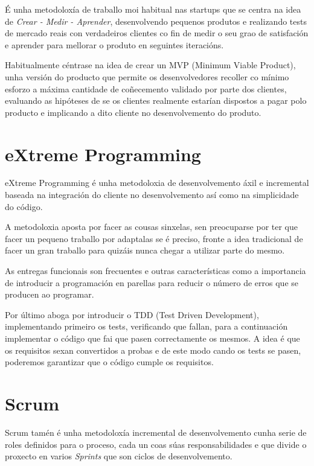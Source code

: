 

  É unha metodoloxía de traballo moi habitual nas startups que se centra na 
idea de \emph{Crear - Medir - Aprender}, desenvolvendo pequenos produtos e 
realizando tests de mercado reais con verdadeiros clientes co fin de medir o 
seu grao de satisfación e aprender para mellorar o produto en seguintes 
iteracións.

  Habitualmente céntrase na idea de crear un MVP (Minimum Viable Product), 
unha versión do producto que permite os desenvolvedores recoller co mínimo 
esforzo a máxima cantidade de coñecemento validado por parte dos clientes, 
evaluando as hipóteses de se os clientes realmente estarían dispostos a pagar 
polo producto e implicando a dito cliente no desenvolvemento do produto.

  \section{eXtreme Programming}
  eXtreme Programming\cite{book:agile} é unha metodoloxia de desenvolvemento 
áxil e incremental baseada na integración do cliente no desenvolvemento así como 
na simplicidade do código.

  A metodoloxia aposta por facer as cousas sinxelas, sen preocuparse por ter 
que facer un pequeno traballo por adaptalas se é preciso, fronte a idea 
tradicional de facer un gran traballo para quizáis nunca chegar a utilizar 
parte do mesmo.

  As entregas funcionais son frecuentes e outras características como a 
importancia de introducir a programación en parellas para reducir o número de 
erros que se producen ao programar.

  Por último aboga por introducir o TDD (Test Driven Development), 
implementando primeiro os tests, verificando que fallan, para a continuación 
implementar o código que fai que pasen correctamente os mesmos.
  A idea é que os requisitos sexan convertidos a probas e de este modo cando os 
tests se pasen, poderemos garantizar que o código cumple os requisitos.

  \section{Scrum}
  Scrum\cite{book:scrum} tamén é unha metodoloxía incremental de desenvolvemento 
cunha serie de roles definidos para o proceso, cada un coas súas 
responsabilidades e que divide o proxecto en varios \emph{Sprints} que son 
ciclos de desenvolvemento.

